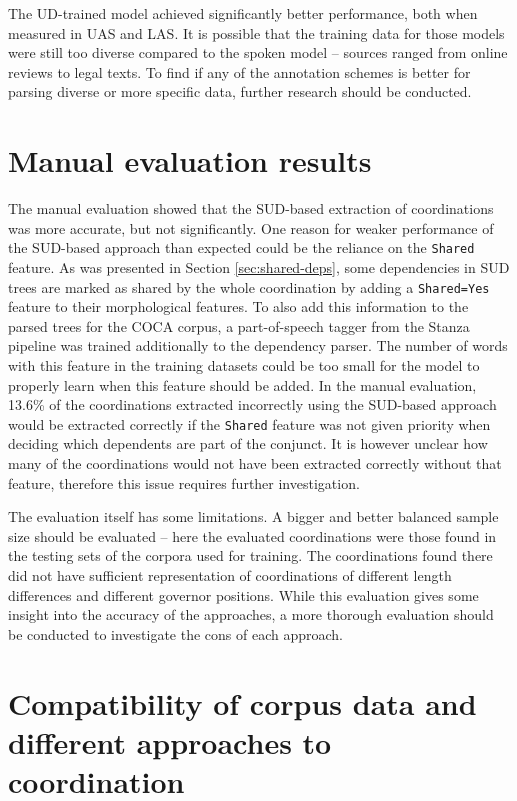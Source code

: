 The UD-trained model achieved significantly better performance, both when measured in UAS and LAS. It is possible that the training data for those models were still too diverse compared to the spoken model -- sources ranged from online reviews to legal texts. To find if any of the annotation schemes is better for parsing diverse or more specific data, further research should be conducted.

\section{Manual evaluation results}

The manual evaluation showed that the SUD-based extraction of coordinations was more accurate, but not significantly. One reason for weaker performance of the SUD-based approach than expected could be the reliance on the \texttt{Shared} feature. As was presented in Section \ref{sec:shared-deps}, some dependencies in SUD trees are marked as shared by the whole coordination by adding a \texttt{Shared=Yes} feature to their morphological features. To also add this information to the parsed trees for the COCA corpus, a part-of-speech tagger from the Stanza pipeline was trained additionally to the dependency parser. The number of words with this feature in the training datasets could be too small for the model to properly learn when this feature should be added. In the manual evaluation, 13.6\% of the coordinations extracted incorrectly using the SUD-based approach would be extracted correctly if the \texttt{Shared} feature was not given priority when deciding which dependents are part of the conjunct. It is however unclear how many of the coordinations would not have been extracted correctly without that feature, therefore this issue requires further investigation. 

The evaluation itself has some limitations. A bigger and better balanced sample size should be evaluated -- here the evaluated coordinations were those found in the testing sets of the corpora used for training. The coordinations found there did not have sufficient representation of coordinations of different length differences and different governor positions. While this evaluation gives some insight into the accuracy of the approaches, a more thorough evaluation should be conducted to investigate the cons of each approach.

\section{Compatibility of corpus data and different approaches to coordination}\label{sec:which-approach}

